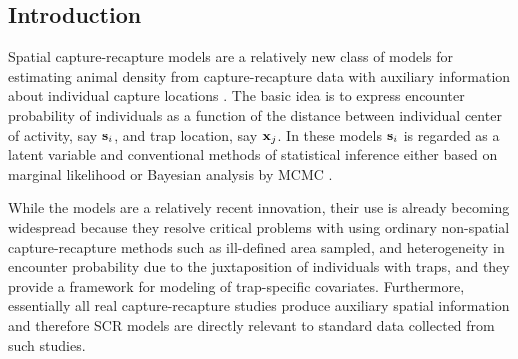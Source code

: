 \documentclass[12pt]{article}
\begin{document}
\begin{spacing}{1.8}

\section{Introduction}


Spatial capture-recapture models are a relatively new class of models
for estimating animal density from capture-recapture data with
auxiliary information about individual capture locations
\citep{borchers_efford:2008, royle_young:2008, efford_etal:2009,
  royle_etal:2009ecol}.
The basic idea is to express encounter probability of
individuals as a function of the distance between individual center of
activity, say ${\bf s}_{i}$, and trap location, say ${\bf x}_{j}$.  In
these models ${\bf s}_{i}$ is regarded as a latent variable and
conventional methods of statistical inference either based on marginal
likelihood \citep{borchers_efford:2008} or Bayesian analysis by MCMC
\citep{royle_young:2008}.

While the models are a relatively recent innovation, their use is
already becoming widespread \citep{efford_etal:2009,
  gardner_etal:2010, kery_etal:2010, efford:2011UO,
  gopalaswamy_etal:2012, foster_harmsen:2012} because they resolve
critical problems with using ordinary non-spatial capture-recapture
methods such as ill-defined area sampled, and heterogeneity in
encounter probability due to the juxtaposition of individuals with
traps, and they provide a framework for modeling of trap-specific
covariates.  Furthermore, essentially all real capture-recapture
studies produce auxiliary spatial information and therefore SCR models
are directly relevant to standard data collected from such studies.


\end{spacing}
\end{document}
